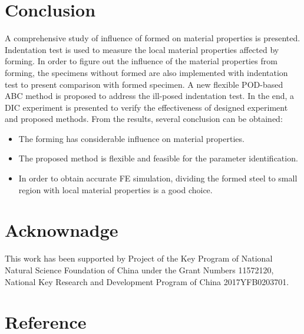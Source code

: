 \documentclass[review]{elsarticle}
\begin{document}
\section{Conclusion}

A comprehensive study of influence of formed on material properties is presented. Indentation test is used to measure the local material properties affected by forming. In order to figure out the influence of the material properties from forming, the specimens without formed are also implemented with indentation test to present comparison with formed specimen. A new flexible POD-based ABC method is proposed to address the ill-posed indentation test. In the end, a DIC experiment is presented to verify the effectiveness of designed experiment and proposed methods. From the results, several conclusion can be obtained:

\begin{itemize}
\item The forming has considerable influence on material properties.
\item The proposed method is flexible and feasible for the parameter identification.
\item In order to obtain accurate FE simulation, dividing the formed steel to small region with local material properties is a good choice.
\end{itemize}


\section*{Acknownadge}

This work has been supported by Project of the Key Program of National Natural Science Foundation of China under the Grant Numbers 11572120, National Key Research and Development Program of China 2017YFB0203701.\



\section*{Reference}



\end{document}
